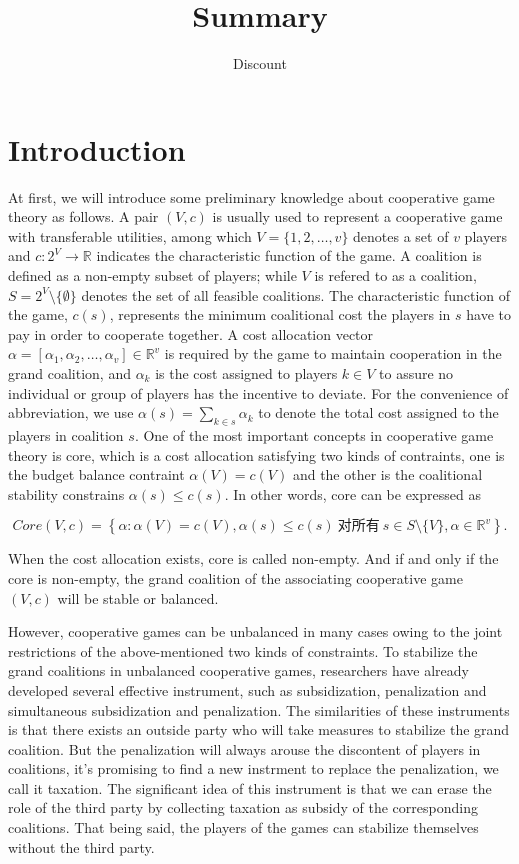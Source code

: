 \documentclass[UTF8]{article}
\title{Summary}
\author{Dis\cdot count}
\begin{document}
\maketitle{}


\section*{Introduction}
At first, we will introduce some preliminary knowledge about cooperative game theory as follows.
A pair $(V,c)$ is usually used to represent a cooperative game with transferable utilities, among which $V=\{1,2,\dots,v\}$ denotes a set of $v$ players and $c:2^{V}\to \mathbb{R}$ indicates the characteristic function of the game. A coalition is defined as a non-empty subset of players; while $V$ is refered to as a coalition, $S=2^{V} \setminus\{\emptyset\}$ denotes the set of all feasible coalitions. The characteristic function of the game, $c(s)$, represents the minimum coalitional cost the players in $s$ have to pay in order to cooperate together.
A cost allocation vector $\alpha=[\alpha_{1},\alpha_{2},\dots,\alpha_{v}] \in \mathbb{R}^{v}$ is required by the game to maintain cooperation in the grand coalition, and $\alpha_{k}$ is the cost assigned to players $k \in V$ to assure no individual or group of players has the incentive to deviate. For the convenience of abbreviation, we use $\alpha(s)=\sum_{k\in{s}}\alpha_{k}$ to denote the total cost assigned to the players in coalition $s$.
One of the most important concepts in cooperative game theory is core, which is a cost allocation satisfying two kinds of contraints, one is the budget balance contraint {$\alpha(V)=c(V)$} and the other is the coalitional stability constrains {$\alpha(s) \leq c(s)$}. In other words, core can be expressed as

\[
Core(V,c)= \left\{\alpha:\alpha(V)=c(V), \alpha(s)\leq c(s)\ \text{对所有}\ s \in S \setminus\{V\}, \alpha \in \mathbb{R}^{v} \right\}.
\]

When the cost allocation exists, core is called non-empty. And if and only if the core is non-empty, the grand coalition of the associating cooperative game $(V,c)$ will be stable or balanced.

However, cooperative games can be unbalanced in many cases owing to the joint restrictions of the above-mentioned two kinds of constraints. To stabilize the grand coalitions in unbalanced cooperative games, researchers have already developed several effective instrument, such as subsidization, penalization and simultaneous subsidization and penalization. The
similarities of these instruments is that there exists an outside party who will take measures to stabilize the grand coalition. But the penalization will always arouse the discontent of players in coalitions, it's promising to find a new instrment to replace the penalization, we call it taxation.
The significant idea of this instrument is that we can erase the role of the third party by collecting taxation as subsidy of the corresponding coalitions.
That being said, the players of the games can stabilize themselves without the third party.
\end{document}
